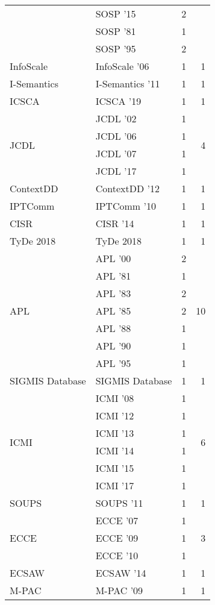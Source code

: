 \begin{table*}[t]
\begin{tabular}{llrr}
& SOSP '15 & 2 &\\
& SOSP '81 & 1 &\\
& SOSP '95 & 2 &\\
\multirow{1}{*}{InfoScale } & InfoScale '06 & 1 & \multirow{1}{*}{1}\\
\multirow{1}{*}{I-Semantics } & I-Semantics '11 & 1 & \multirow{1}{*}{1}\\
\multirow{1}{*}{ICSCA } & ICSCA '19 & 1 & \multirow{1}{*}{1}\\
\multirow{4}{*}{JCDL } & JCDL '02 & 1 & \multirow{4}{*}{4}\\
& JCDL '06 & 1 &\\
& JCDL '07 & 1 &\\
& JCDL '17 & 1 &\\
\multirow{1}{*}{ContextDD } & ContextDD '12 & 1 & \multirow{1}{*}{1}\\
\multirow{1}{*}{IPTComm } & IPTComm '10 & 1 & \multirow{1}{*}{1}\\
\multirow{1}{*}{CISR } & CISR '14 & 1 & \multirow{1}{*}{1}\\
\multirow{1}{*}{TyDe 2018} & TyDe 2018 & 1 & \multirow{1}{*}{1}\\
\multirow{7}{*}{APL } & APL '00 & 2 & \multirow{7}{*}{10}\\
& APL '81 & 1 &\\
& APL '83 & 2 &\\
& APL '85 & 2 &\\
& APL '88 & 1 &\\
& APL '90 & 1 &\\
& APL '95 & 1 &\\
\multirow{1}{*}{SIGMIS Database} & SIGMIS Database & 1 & \multirow{1}{*}{1}\\
\multirow{6}{*}{ICMI } & ICMI '08 & 1 & \multirow{6}{*}{6}\\
& ICMI '12 & 1 &\\
& ICMI '13 & 1 &\\
& ICMI '14 & 1 &\\
& ICMI '15 & 1 &\\
& ICMI '17 & 1 &\\
\multirow{1}{*}{SOUPS } & SOUPS '11 & 1 & \multirow{1}{*}{1}\\
\multirow{3}{*}{ECCE } & ECCE '07 & 1 & \multirow{3}{*}{3}\\
& ECCE '09 & 1 &\\
& ECCE '10 & 1 &\\
\multirow{1}{*}{ECSAW } & ECSAW '14 & 1 & \multirow{1}{*}{1}\\
\multirow{1}{*}{M-PAC } & M-PAC '09 & 1 & \multirow{1}{*}{1}\\

\end{tabular}
\end{table*}
